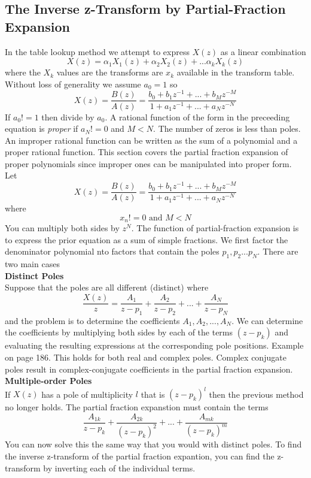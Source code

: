 \documentclass{article} %
\begin{document}
	\subsection{The Inverse z-Transform by Partial-Fraction Expansion}
	In the table lookup method we attempt to express $X(z)$ as a linear combination
	\begin{equation}
	X(z) = \alpha_1X_1(z) + \alpha_2X_2(z) + ... \alpha_kX_k(z)
	\end{equation}
	where the $X_k$ values are the transforms are $x_k$ available in the transform table. Without loss of generality we assume $a_0 = 1$ so 
	\begin{equation}
	X(z) = \frac{B(z)}{A(z)} = \frac{b_0 + b_1z^{-1} + ... + b_Mz^{-M}}{1 + a_1z^{-1} + ... + a_Nz^{-N}}
	\end{equation}
	If $a_0 != 1$ then divide by $a_0$. A rational function of the form in the preceeding equation is \textit{proper} if $a_N != 0$ and $M < N$. The number of zeros is less than poles. An improper rational function can be written as the sum of a polynomial and a proper rational function. This section covers the partial fraction expansion of proper polynomials since improper ones can be manipulated into proper form. Let
	\begin{equation}
	X(z) = \frac{B(z)}{A(z)} = \frac{b_0 + b_1z^{-1} + ... + b_Mz^{-M}}{1 + a_1z^{-1} + ... + a_Nz^{-N}}
	\end{equation}
	where 
	\begin{equation}
	x_n != 0 \text{ and } M < N
	\end{equation}
	You can multiply both sides by $z^N$. The function of partial-fraction expansion is to express the prior equation as a sum of simple fractions. We first factor the denominator polynomial nto factors that contain the poles $p_1, p_2 ... p_N$. There are two main cases\\
	\textbf{Distinct Poles}\\
	Suppose that the poles are all different (distinct) where
	\begin{equation}
	\frac{X(z)}{z} = \frac{A_1}{z-p_1} + \frac{A_2}{z-p_2} + ... + \frac{A_N}{z-p_N}
	\end{equation}
	and the problem is to determine the coefficients $A_1, A_2, ..., A_N$. We can determine the coefficients by multiplying both sides by each of the terms $(z-p_k)$ and evaluating the resulting expressions at the corresponding pole positions. Example on page 186. This holds for both real and complex poles. Complex conjugate poles result in complex-conjugate coefficients in the partial fraction expansion. \\
	\textbf{Multiple-order Poles}\\
	If $X(z)$ has a pole of multiplicity $l$ that is $(z-p_k)^l$ then the previous method no longer holds. The partial fraction expanstion must contain the terms 
	\begin{equation}
	\frac{A_{1k}}{z-p_k} + \frac{A_{2k}}{(z-p_k)^2} + ... + \frac{A_{mk}}{(z-p_k)^m}
	\end{equation}	 
	You can now solve this the same way that you would with distinct poles. To find the inverse z-transform of the partial fraction expantion, you can find the z-transform by inverting each of the individual terms. 
	
\end{document}
